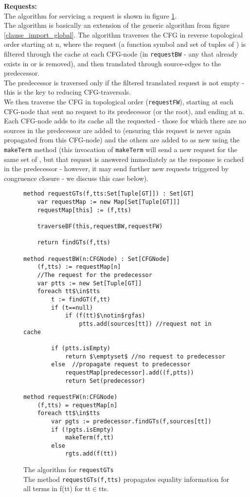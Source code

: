 \noindent
\textbf{Requests:}\\
The algorithm for servicing a request is shown in figure \ref{EC_propagate_request}.\\
The algorithm is basically an extension of the generic algorithm from figure \ref{clause_import_global}.
The algorithm traverses the CFG in reverse topological order starting at n,
where the request (a function symbol and set of tuples of \GTs{}) is filtered through the 
cache at each CFG-node (in \lstinline|requestBW| - any \GFA{} that already exists in  or  is removed),
and then translated through source-edges to the predecessor.\\
The predecessor is traversed only if the filtered translated request is not empty - this is the key to reducing CFG-traversals.\\
We then traverse the CFG in topological order (\lstinline|requestFW|), starting at each CFG-node that sent no request to its predecessor (or the root), and ending at n.\\
Each CFG-node adds to its cache all the requested \GFAs{} - those for which there are no sources in the predecessor are added to  (ensuring this request is never again propagated from this CFG-node) and the others are added to  as new \GTs{} using the \lstinline|makeTerm| method (this invocation of \lstinline|makeTerm| will send a new request for the same set of \GFAs{}, but that request is answered immediately as the response is cached in the predecessor - however, it may send further new requests triggered by congruence closure - we discuss this case below).

\begin{figure}
\begin{lstlisting}
method requestGTs(f,tts:Set[Tuple[GT]]) : Set[GT]
	var requestMap := new Map[Set[Tuple[GT]]]
	requestMap[this] := (f,tts)
	
	traverseBF(this,requestBW,requestFW)
	
	return findGTs(f,tts)

method requestBW(n:CFGNode) : Set[CFGNode] 
	(f,tts) := requestMap[n]
	//The request for the predecessor
	var ptts := new Set[Tuple[GT]]
	foreach tt$\in$tts
		t := findGT(f,tt)
		if (t==null) 
			if (f(tt)$\notin$rgfas) 
				ptts.add(sources[tt]) //request not in cache
		
		if (ptts.isEmpty)
			return $\emptyset$ //no request to predecessor
		else  //propagate request to predecessor
			requestMap[predecessor].add((f,ptts))
			return Set(predecessor)
		
method requestFW(n:CFGNode) 
	(f,tts) = requestMap[n]
	foreach tt$\in$tts
		var pgts := predecessor.findGTs(f,sources[tt])
		if (!pgts.isEmpty)
			makeTerm(f,tt)
		else
			rgts.add(f(tt))
\end{lstlisting}
\caption{The algorithm for \lstinline|requestGTs|\\
The method \lstinline|requestGTs(f,tts)| propagates equality information for all terms in f(tt) for tt$\in$tts.\\
}
\label{EC_propagate_request}
\end{figure}


